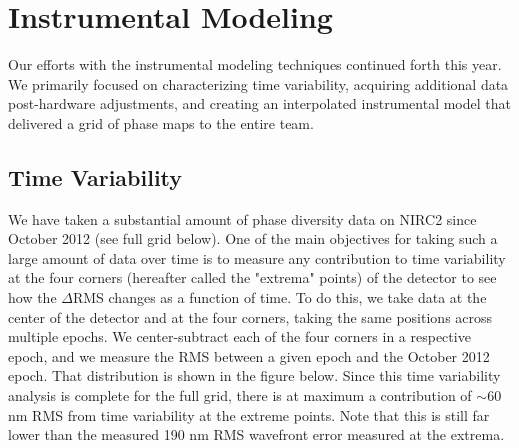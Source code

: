 \section{Instrumental Modeling}
\label{sec:instrument}

Our efforts with the instrumental modeling techniques continued forth
this year. We primarily focused on characterizing time variability,
acquiring additional data post-hardware adjustments, and creating an
interpolated instrumental model that delivered a grid of phase maps to
the entire team. 

\subsection{Time Variability}
We have taken a substantial amount of phase diversity data on NIRC2
since October 2012 (see full grid below). One of the main objectives
for taking such a large amount of data over time is to measure any
contribution to time variability at the four corners (hereafter called
the "extrema" points) of the detector to see how the $\Delta$RMS
changes as a function of time. To do this, we take data at the center
of the detector and at the four corners, taking the same positions
across multiple epochs. We center-subtract each of the four corners in
a respective epoch, and we measure the RMS between a given epoch and
the October 2012 epoch. That distribution is shown in the figure
below. Since this time variability analysis is complete for the full grid, there is at maximum a contribution of $\sim$60 nm RMS from time variability at the extreme points. Note that this is still far lower than the measured 190 nm RMS wavefront error measured at the extrema.

    
    
    
    
    
    
    
    
    
  
  
  